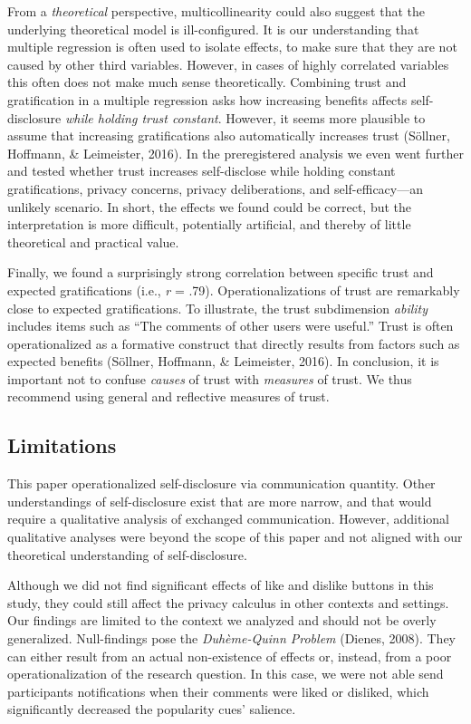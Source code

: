 \documentclass[
  english,
  man,floatsintext]{apa6}
\begin{document}
From a \emph{theoretical} perspective, multicollinearity could also suggest that the underlying theoretical model is ill-configured.
It is our understanding that multiple regression is often used to isolate effects, to make sure that they are not caused by other third variables.
However, in cases of highly correlated variables this often does not make much sense theoretically.
Combining trust and gratification in a multiple regression asks how increasing benefits affects self-disclosure \emph{while holding trust constant}.
However, it seems more plausible to assume that increasing gratifications also automatically increases trust (Söllner, Hoffmann, \& Leimeister, 2016).
In the preregistered analysis we even went further and tested whether trust increases self-disclose while holding constant gratifications, privacy concerns, privacy deliberations, and self-efficacy---an unlikely scenario.
In short, the effects we found could be correct, but the interpretation is more difficult, potentially artificial, and thereby of little theoretical and practical value.

Finally, we found a surprisingly strong correlation between specific trust and expected gratifications (i.e., \emph{r} = .79).
Operationalizations of trust are remarkably close to expected gratifications.
To illustrate, the trust subdimension \emph{ability} includes items such as ``The comments of other users were useful.''
Trust is often operationalized as a formative construct that directly results from factors such as expected benefits (Söllner, Hoffmann, \& Leimeister, 2016).
In conclusion, it is important not to confuse \emph{causes} of trust with \emph{measures} of trust.
We thus recommend using general and reflective measures of trust.

\hypertarget{limitations}{%
\subsection{Limitations}\label{limitations}}

This paper operationalized self-disclosure via communication quantity.
Other understandings of self-disclosure exist that are more narrow, and that would require a qualitative analysis of exchanged communication.
However, additional qualitative analyses were beyond the scope of this paper and not aligned with our theoretical understanding of self-disclosure.

Although we did not find significant effects of like and dislike buttons in this study, they could still affect the privacy calculus in other contexts and settings.
Our findings are limited to the context we analyzed and should not be overly generalized.
Null-findings pose the \emph{Duhème-Quinn Problem} (Dienes, 2008).
They can either result from an actual non-existence of effects or, instead, from a poor operationalization of the research question.
In this case, we were not able send participants notifications when their comments were liked or disliked, which significantly decreased the popularity cues' salience.
\end{document}

